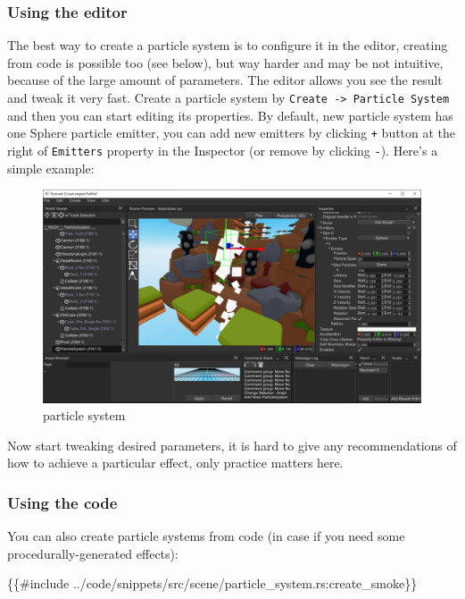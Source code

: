 \documentclass[
]{book}
\newenvironment{Shaded}{\begin{snugshade}}{\end{snugshade}}
\newcommand{\NormalTok}[1]{#1}
\theoremstyle{definition}
\theoremstyle{definition}
\theoremstyle{definition}
\theoremstyle{definition}
\theoremstyle{remark}
\begin{document}
\subsubsection{Using the editor}\label{using-the-editor}

The best way to create a particle system is to configure it in the editor, creating from code is possible too (see below), but way harder and may be not intuitive, because of the large amount of parameters. The editor allows you see the result and tweak it very fast. Create a particle system by \texttt{Create\ -\textgreater{}\ Particle\ System} and then you can start editing its properties. By default, new particle system has one Sphere particle emitter, you can add new emitters by clicking \texttt{+} button at the right of \texttt{Emitters} property in the Inspector (or remove by clicking \texttt{-}). Here's a simple example:

\begin{figure}
\centering
\includegraphics{images/scene_particle_system.png}
\caption{particle system}
\end{figure}

Now start tweaking desired parameters, it is hard to give any recommendations of how to achieve a particular effect, only practice matters here.

\subsubsection{Using the code}\label{using-the-code}

You can also create particle systems from code (in case if you need some procedurally-generated effects):

\begin{Shaded}
\begin{Highlighting}[]
\NormalTok{\{\{\#include ../code/snippets/src/scene/particle\_system.rs:create\_smoke\}\}}
\end{Highlighting}
\end{Shaded}
\end{document}
